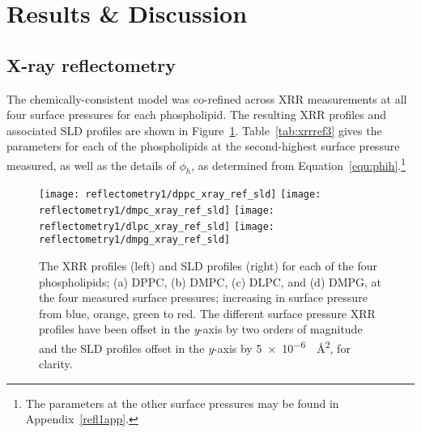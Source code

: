 \section{Results \& Discussion}
\subsection{X-ray reflectometry}
The chemically-consistent model was co-refined across XRR measurements at all four surface pressures for each phospholipid.
The resulting XRR profiles and associated SLD profiles are shown in Figure~\ref{fig:xrrref}.
Table~\ref{tab:xrrref3} gives the parameters for each of the phospholipids at the second-highest surface pressure measured, as well as the details of $\phi_h$, as determined from Equation~\ref{equ:phih}.\footnote{The parameters at the other surface pressures may be found in Appendix~\ref{refl1app}.}
%
\begin{figure}
    \centering
    \texttt{[image: reflectometry1/dppc\_xray\_ref\_sld]}
    \texttt{[image: reflectometry1/dmpc\_xray\_ref\_sld]}
    \texttt{[image: reflectometry1/dlpc\_xray\_ref\_sld]}
    \texttt{[image: reflectometry1/dmpg\_xray\_ref\_sld]}
    \caption{The XRR profiles (left) and SLD profiles (right) for each of the four phospholipids; (a) DPPC, (b) DMPC, (c) DLPC, and (d) DMPG, at the four measured surface pressures; increasing in surface pressure from blue, orange, green to red. The different surface pressure XRR profiles have been offset in the \emph{y}-axis by two orders of magnitude and the SLD profiles offset in the \emph{y}-axis by \SI{5e-6}{\per\angstrom\squared}, for clarity.}
    \label{fig:xrrref}
\end{figure}
%
%
